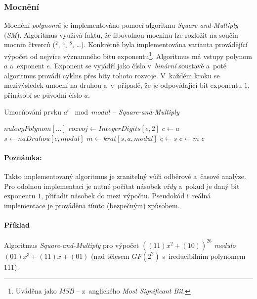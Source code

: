 \documentclass[thesis=M,czech,hidelinks]{FITthesis}[2012/06/26]
\newcommand{\0}{{\textcolor[gray]{0.75}{0}}}
\newenvironment{algoritmus}{
    \floatname{algorithm}{Algoritmus}
    \begin{algorithm}
}{\end{algorithm}}
\begin{document}
\subsubsection{Mocnění}

Mocnění \emph{polynomů} je implementováno pomocí algoritmu
\emph{Square-and-Multiply} (\emph{SM}). Algoritmus využívá faktu, že libovolnou
mocninu lze rozložit na součin mocnin čtverců ($^2$, $^4$, $^8$, \ldots). Konkrétně
byla implementována varianta provádějící výpočet od nejvíce významného bitu
exponentu\footnote{
    Uváděna jako \emph{MSB} -- z~anglického \emph{Most Significant Bit}.
}. Algoritmus má vstupy polynom $a$ a~exponent $e$. Exponent se vyjádří jako
číslo v~\emph{binární} soustavě a~poté algoritmus provádí cyklus přes bity
tohoto rozvoje. V~každém kroku se mezivýsledek umocní na druhou a~v~případě, že
je odpovídající bit exponentu $1$, přinásobí se původní číslo $a$.


\begin{algoritmus}[!ht]
    \caption{Umocňování prvku $a^e \mod modul$ -- \emph{Square-and-Multiply}}
    \begin{algorithmic}[1]
            \State \Return $nulovyPolynom[\ldots]$
        \EndIf
        \State $ rozvoj \gets IntegerDigits[ e, 2 ] $
        \State $ c \gets a $
            \State $ s \gets naDruhou[ c, modul ] $
            \State $ m \gets krat[ s, a, modul ] $
                \State $ c \gets s $
            \Else
                \State $ c \gets m $
            \EndIf
        \EndFor
        \State \Return $c$
     \EndFunction
    \end{algorithmic}
\end{algoritmus}


\paragraph{Poznámka:} Takto implementovaný algoritmus je zranitelný vůči
odběrové a~časové analýze. Pro odolnou implementaci je nutné počítat násobek
\emph{vždy} a~pokud je daný bit exponentu $1$, přiřadit násobek do mezi výpočtu.
Pseudokód i~reálná implementace je prováděna tímto (bezpečným) způsobem.

\paragraph{Příklad} Algoritmus \emph{Square-and-Multiply} pro výpočet
$\left( (11)x^2 + (10) \right)^{26}$ \emph{modulo} $(01)x^3 + (11)x + (01)$
(nad tělesem $GF(2^2)$ s~ireducibilním polynomem~$111$):
\end{document}
